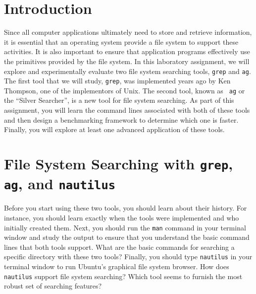


\usepackage[compact]{titlesec}



\section*{Introduction}

Since all computer applications ultimately need to store and retrieve information, it is essential that an operating
system  provide a file system to support these activities.  It is also important to ensure that application programs
effectively use the primitives provided by the file system.  In this laboratory assignment, we will explore and
experimentally evaluate two file system searching tools, {\tt grep} and {\tt ag}. The first tool that we will study,
{\tt grep}, was implemented years ago by Ken Thompson, one of the implementors of Unix.  The second tool, known as {\tt
ag} or the ``Silver Searcher'', is a new tool for file system searching. As part of this assignment, you will learn the
command lines associated with both of these tools and then design a benchmarking framework to determine which one is
faster.  Finally, you will explore at least one advanced application of these tools.

\section*{File System Searching with {\tt grep}, {\tt ag}, and {\tt nautilus}}

Before you start using these two tools, you should learn about their history. For instance, you should learn exactly
when the tools were implemented and who initially created them. Next, you should run the {\tt man} command in your
terminal window and study the output to ensure that you understand the basic command lines that both tools support. What
are the basic commands for searching a specific directory with these two tools? Finally, you should type {\tt nautilus}
in your terminal window to run Ubuntu's graphical file system browser.  How does {\tt nautilus} support file
system searching?  Which tool seems to furnish the most robust set of searching features?

